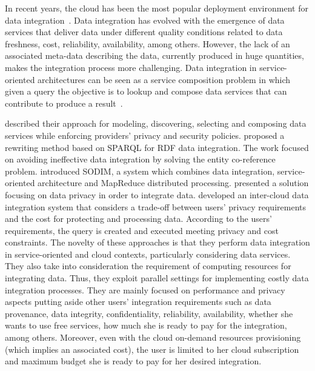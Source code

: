 In recent years, the cloud has been the most popular deployment environment for data integration~\cite{Carvalho2015}.
Data integration has evolved with the emergence of data services that deliver data under different quality conditions related to data freshness, cost, reliability, availability, among others. 
%
However, the lack of an associated meta-data describing the data, currently produced in huge quantities, makes the integration process more challenging. 
%
Data integration in service-oriented architectures can be seen as a service composition problem in which given a query the objective is to lookup and compose data services that can contribute to produce a result~\cite{Benslimane:2013, Correndo2010, ElSheikh2013, Tian2010, YauY08}. 
%

\cite{Benslimane:2013} described their approach for modeling, discovering, selecting and composing data services while enforcing providers' privacy and security policies.
\cite{Correndo2010} proposed a rewriting method based on SPARQL for RDF data integration. The work focused on avoiding ineffective data integration by solving the entity co-reference problem. \cite{ElSheikh2013} introduced SODIM, a system which combines data integration, service-oriented architecture and MapReduce distributed processing. \cite{YauY08} presented a solution focusing on data privacy in order to integrate data. \cite{Tian2010} developed an inter-cloud data integration system that considers a trade-off between users' privacy requirements and the cost for protecting and processing data. According to the users' requirements, the query is created and executed meeting privacy and cost constraints. 
%
The novelty of these approaches is that they perform data integration in service-oriented and cloud contexts, particularly considering data services. They also take into consideration the requirement of computing resources for integrating data. Thus, they exploit parallel settings for implementing costly data integration processes. They are mainly focused on performance and privacy aspects putting aside other users' integration requirements such as data provenance, data integrity, confidentiality, reliability, availability, whether she wants to use free services, how much she is ready to pay for the integration, among others. 
%
Moreover, even with the cloud on-demand resources provisioning (which implies an  associated cost), the user is limited to her cloud subscription and maximum budget she is ready to pay for her desired integration. 

